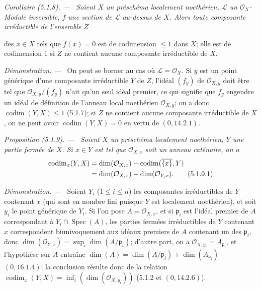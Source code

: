 \documentclass[10pt,oneside]{book}
\newcommand{\oldpage}[2][]{%
  \setcounter{footnote}{0}%
  \marginpar{\scriptsize\textbf{#1}~|~#2}\ignorespaces}
\newenvironment{proposition}[1][]{%
  \par\medskip\noindent\itshape Proposition (#1). ---\ }{\par}
\newenvironment{corollary}[1][]{%
  \par\medskip\noindent\itshape Corollaire (#1). ---\ }{\par}
\newenvironment{proof}{%
  \par\medskip\noindent\textit{Démonstration. ---\ }}{\par}
\begin{document}
\begin{corollary}[5.1.8]
\label{IV.2.5.1.8-fr}
Soient $X$ un préschéma localement noethérien, $\mathcal L$ un
$\mathcal O_X$-Module inversible, $f$ une section de $\mathcal L$ au-dessus
de $X$. Alors toute composante irréductible de l'ensemble $Z$

\oldpage[IV-2]{88}

des $x\in X$ tels que $f(x)=0$ est de codimension $\leq1$ dans $X$; elle est
de codimension $1$ si $Z$ ne contient aucune composante irréductible de $X$.
\end{corollary}

\begin{proof}
On peut se borner au cas où $\mathcal L=\mathcal O_X$. Si $y$ est un point
générique d'une composante irréductible $Y$ de $Z$, l'idéal $(f_y)$ de
$\mathcal O_{X,y}$ doit être tel que $\mathcal O_{X,y}/(f_y)$ n'ait qu'un
seul idéal premier, ce qui signifie que $f_y$ engendre un idéal de définition
de l'anneau local noethérien $\mathcal O_{X,y}$; on a donc
$\operatorname{codim}(Y,X)\leq1$ (5.1.7); si $Z$ ne contient aucune
composante irréductible de $X$, on ne peut avoir
$\operatorname{codim}(Y,X)=0$ en vertu de $(0,14.2.1)$.
\end{proof}

\begin{proposition}[5.1.9]
\label{IV.2.5.1.9-fr}
Soient $X$ un préschéma localement noethérien, $Y$ une partie fermée de $X$.
Si $x\in Y$ est tel que $\mathcal O_{X,x}$ soit un anneau caténaire, on a
\begin{align}
\operatorname{codim}_x(Y,X)
&=\dim(\mathcal O_{X,x})-\operatorname{codim}(\overline{\{x\}},Y)\notag\\
&=\dim(\mathcal O_{X,x})-\dim(\mathcal O_{Y,x}).
\tag{5.1.9.1}\label{IV.2.5.1.9.1-fr}
\end{align}
\end{proposition}

\begin{proof}
Soient $Y_i$ ($1\leq i\leq n$) les composantes irréductibles de $Y$
contenant $x$ (qui sont en nombre fini puisque $Y$ est localement
noethérien), et soit $y_i$ le point générique de $Y_i$. Si l'on pose
$A=\mathcal O_{X,x}$, et si $\mathfrak p_i$ est l'idéal premier de $A$
correspondant à $Y_i\cap\operatorname{Spec}(A)$, les parties fermées
irréductibles de $Y$ contenant $x$ correspondent biunivoquement aux idéaux
premiers de $A$ contenant un des $\mathfrak p_i$, donc
$\dim(\mathcal O_{Y,x})=\sup_i\dim(A/\mathfrak p_i)$; d'autre part, on a
$\mathcal O_{X,y_i}=A_{\mathfrak p_i}$, et l'hypothèse sur $A$ entraîne
$\dim(A)=\dim(A/\mathfrak p_i)+\dim(A_{\mathfrak p_i})$ $(0,16.1.4)$; la
conclusion résulte donc de la relation
$\operatorname{codim}_x(Y,X)=\inf_i(\dim(\mathcal O_{X,y_i}))$ (5.1.2 et
$(0,14.2.6)$).
\end{proof}
\end{document}
